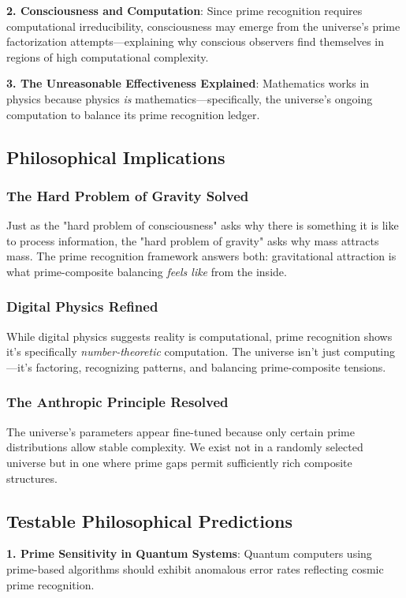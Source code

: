 \documentclass[12pt]{article}
\begin{document}
\textbf{2. Consciousness and Computation}: Since prime recognition requires computational irreducibility, consciousness may emerge from the universe's prime factorization attempts—explaining why conscious observers find themselves in regions of high computational complexity.

\textbf{3. The Unreasonable Effectiveness Explained}: Mathematics works in physics because physics \textit{is} mathematics—specifically, the universe's ongoing computation to balance its prime recognition ledger.

\subsection{Philosophical Implications}

\subsubsection{The Hard Problem of Gravity Solved}
Just as the "hard problem of consciousness" asks why there is something it is like to process information, the "hard problem of gravity" asks why mass attracts mass. The prime recognition framework answers both: gravitational attraction is what prime-composite balancing \textit{feels like} from the inside.

\subsubsection{Digital Physics Refined}
While digital physics suggests reality is computational, prime recognition shows it's specifically \textit{number-theoretic} computation. The universe isn't just computing—it's factoring, recognizing patterns, and balancing prime-composite tensions.

\subsubsection{The Anthropic Principle Resolved}
The universe's parameters appear fine-tuned because only certain prime distributions allow stable complexity. We exist not in a randomly selected universe but in one where prime gaps permit sufficiently rich composite structures.

\subsection{Testable Philosophical Predictions}

\textbf{1. Prime Sensitivity in Quantum Systems}: Quantum computers using prime-based algorithms should exhibit anomalous error rates reflecting cosmic prime recognition.
\end{document}
